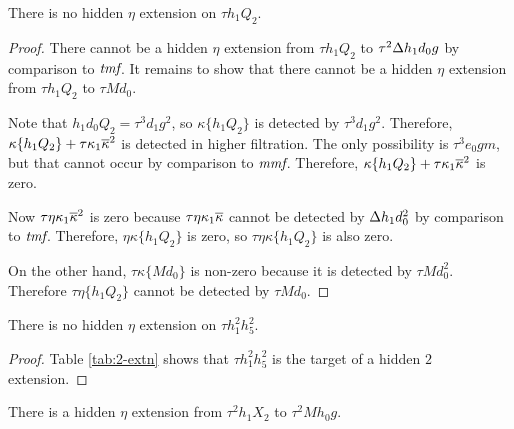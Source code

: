 \begin{lemma}
\label{lem:eta-th1Q2}
There is no hidden $\eta$ extension on $\tau h_1 Q_2$.
\end{lemma}

\begin{proof}
There cannot be a hidden $\eta$ extension from
$\tau h_1 Q_2$ to $\tau^2 \Delta h_1 d_0 g$ by comparison to $\textit{tmf}$.
It remains to show that there cannot be a hidden
$\eta$ extension from $\tau h_1 Q_2$ to $\tau M d_0$.

Note that $h_1 d_0 Q_2 = \tau^3 d_1 g^2$,
so $\kappa \{h_1 Q_2\}$ is detected by
$\tau^3 d_1 g^2$.  Therefore,
$\kappa \{h_1 Q_2\} + \tau \kappa_1 \overline{\kappa}^2$
is detected in higher filtration.
The only possibility is $\tau^3 e_0 g m$, but that cannot occur
by comparison to $\textit{mmf}$.
Therefore,
$\kappa \{h_1 Q_2\} + \tau \kappa_1 \overline{\kappa}^2$ is zero.

Now $\tau \eta \kappa_1 \overline{\kappa}^2$ is zero because
$\tau \eta \kappa_1 \overline{\kappa}$ cannot be detected by
$\Delta h_1 d_0^2$ by comparison to $\textit{tmf}$.
Therefore,
$\eta \kappa \{h_1 Q_2\}$ is zero,
so $\tau \eta \kappa \{h_1 Q_2\}$ is also zero.

On the other hand, $\tau \kappa \{M d_0\}$ is non-zero
because it is detected by $\tau M d_0^2$.
Therefore $\tau \eta \{h_1 Q_2\}$ cannot be detected
by $\tau M d_0$.
\end{proof}

\begin{lemma}
\label{lem:eta-th1^2h5^2}
There is no hidden $\eta$ extension on $\tau h_1^2 h_5^2$.
\end{lemma}

\begin{proof}
Table \ref{tab:2-extn} shows that $\tau h_1^2 h_5^2$ is the
target of a hidden $2$ extension.
\end{proof}

\begin{lemma}
\label{lem:eta-t^2h1X2}
There is a hidden $\eta$ extension from $\tau^2 h_1 X_2$
to $\tau^2 M h_0 g$.
\end{lemma}

